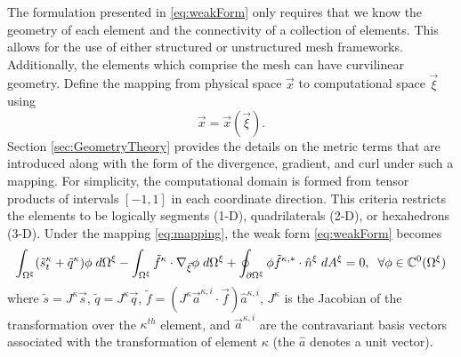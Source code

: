 \documentclass[12pt]{softwaremanual}
\begin{document}
  The formulation presented in \eqref{eq:weakForm} only requires that we know the geometry of each element and the connectivity of a collection of elements. This allows for the use of either structured or unstructured mesh frameworks. Additionally, the elements which comprise the mesh can have curvilinear geometry. Define the mapping from physical space $\vec{x}$ to computational space $\vec{\xi}$ using
  \begin{equation}
  \vec{x} = \vec{x}(\vec{\xi}).\label{eq:mapping}
  \end{equation}
  Section \ref{sec:GeometryTheory} provides the details on the metric terms that are introduced along with the form of the divergence, gradient, and curl under such a mapping. For simplicity, the computational domain is formed from tensor products of intervals $[-1, 1]$ in each coordinate direction. This criteria restricts the elements to be logically segments (1-D), quadrilaterals (2-D), or hexahedrons (3-D). Under the mapping \eqref{eq:mapping}, the weak form \eqref{eq:weakForm} becomes
  \begin{equation}
  \int_{\Omega^\xi} (\tilde{s}^\kappa_t + \tilde{q}^\kappa) \phi \hspace{1mm} d\Omega^\xi  - \int_{\Omega^\xi} \tilde{f}^\kappa \cdot \nabla_{\vec{\xi}} \phi  \hspace{1mm} d\Omega^\xi + \oint_{\partial \Omega^\xi} \phi \tilde{f}^{\kappa,*}  \cdot \hat{n}^\xi \hspace{1mm} d A^\xi = 0, \hspace{2mm} \forall \phi \in \mathbb{C}^0(\Omega^\xi) \label{eq:mappedWeakForm}
  \end{equation}
  where $\tilde{s} = J^\kappa\vec{s}$, $\tilde{q} = J^\kappa\vec{q}$, $\tilde{f} = ( J^\kappa \vec{a}^{\kappa,i} \cdot \vec{f} ) \hat{a}^{\kappa,i}$, $J^{\kappa}$ is the Jacobian of the transformation over the $\kappa^{th}$ element, and $\vec{a}^{\kappa,i}$ are the contravariant basis vectors associated with the transformation of element $\kappa$ (the $\hat{a}$ denotes a unit vector).\\
  
\end{document}
